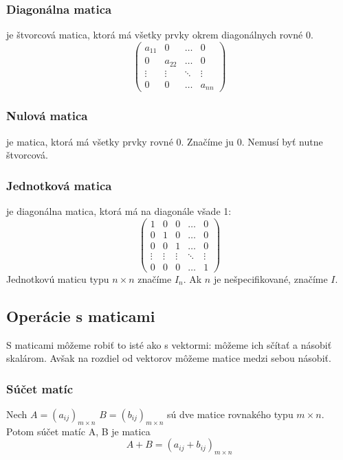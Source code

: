 \subsubsection{Diagonálna matica} je štvorcová matica, ktorá má všetky prvky okrem diagonálnych rovné 0.
\[ \begin{pmatrix} a_{11} & 0 & \dots & 0 \\ 0 & a_{22} & \dots & 0 \\ \vdots & \vdots & \ddots & \vdots \\ 0 & 0 & \dots & a_{nn} \end{pmatrix} \]

\subsubsection{Nulová matica} je matica, ktorá má všetky prvky rovné 0. Značíme ju 0. Nemusí byť nutne štvorcová.

\subsubsection{Jednotková matica} je diagonálna matica, ktorá má na diagonále všade 1:
\[ \begin{pmatrix} 1 & 0 & 0 & \dots & 0 \\ 0 & 1 & 0 & \dots & 0 \\ 0 & 0 & 1 & \dots & 0 \\ \vdots & \vdots & \vdots & \ddots & \vdots \\ 0 & 0 & 0 & \dots & 1 \end{pmatrix} \]
Jednotkovú maticu typu $n \times n$ značíme $I_n$. Ak $n$ je nešpecifikované, značíme $I$.

\subsection{Operácie s maticami}

S maticami môžeme robiť to isté ako s vektormi: môžeme ich sčítať a násobiť
skalárom. Avšak na rozdiel od vektorov môžeme matice medzi sebou násobiť.

\subsubsection{Súčet matíc}
Nech $A = (a_{ij})_{m \times n}$
$B = (b_{ij})_{m \times n}$
sú dve matice rovnakého typu $m \times n$. Potom súčet matíc A, B je matica
\[ A + B = (a_{ij} + b_{ij})_{m \times n} \]

